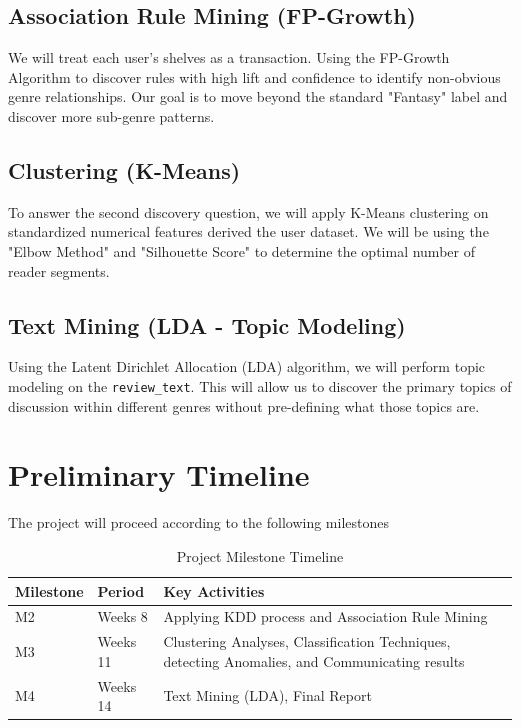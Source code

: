 \documentclass[conference]{IEEEtran}
\begin{document}
\subsection{Association Rule Mining (FP-Growth)}\label{AA}
    We will treat each user's shelves as a transaction. Using the FP-Growth Algorithm to discover rules with high lift and confidence to identify non-obvious genre relationships. Our goal is to move beyond the standard "Fantasy" label and discover more sub-genre patterns.
\subsection{Clustering (K-Means)}
    To answer the second discovery question, we will apply K-Means clustering on standardized numerical features derived the user dataset. We will be using the "Elbow Method" and "Silhouette Score" to determine the optimal number of reader segments.
\subsection{Text Mining (LDA - Topic Modeling)}
    Using the Latent Dirichlet Allocation (LDA) algorithm, we will perform topic modeling on the \texttt{review\_text}. This will allow us to discover the primary topics of discussion within different genres without pre-defining what those topics are.

\section {Preliminary Timeline}
The project will proceed according to the following milestones

\begin{table}[htbp]
\caption{Project Milestone Timeline}
\begin{center}
\begin{tabular}{@{}llp{4.5cm}@{}}
\toprule
\textbf{Milestone} & \textbf{Period} & \textbf{Key Activities} \\ \midrule
M2 & Weeks 8 & Applying KDD process and Association Rule Mining \\
M3 & Weeks 11 & Clustering Analyses, Classification Techniques, detecting Anomalies, and Communicating results \\
M4 & Weeks 14 & Text Mining (LDA), Final Report \\ \bottomrule
\end{tabular}
\end{center}
\end{table}
\end{document}
